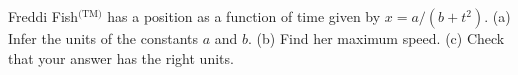  Freddi Fish$^\text{(TM)}$ has a position as a function of time given by
$x=a/(b+t^2)$. (a) Infer the units of the constants $a$ and $b$.
(b) Find her maximum speed. (c) Check that your answer has the right units.
\answercheck

